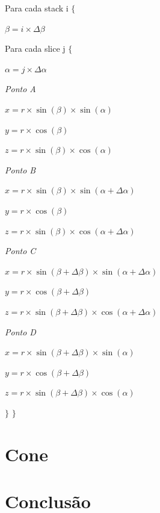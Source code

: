 \documentclass{article}
\begin{document}
Para cada stack i $\{$\newline
\par $\beta = i \times \Delta\beta$ \newline
\par Para cada slice j $\{$ \newline
\par $\alpha = j \times \Delta\alpha$ \newline\newline
\par\textit{Ponto A} \newline
\par$x = r\times\sin(\beta)\times\sin(\alpha)$ \newline
\par$y = r\times\cos(\beta)$ \newline
\par$z = r\times\sin(\beta)\times\cos(\alpha)$ \newline\newline
\par\textit{Ponto B} \newline
\par$x = r\times\sin(\beta)\times\sin(\alpha + \Delta\alpha)$ \newline
\par$y = r\times\cos(\beta)$ \newline
\par$z = r\times\sin(\beta)\times\cos(\alpha + \Delta\alpha)$ \newline\newline
\par\textit{Ponto C} \newline
\par$x = r\times\sin(\beta + \Delta\beta)\times\sin(\alpha + \Delta\alpha)$ \newline
\par$y = r\times\cos(\beta + \Delta\beta)$ \newline
\par$z = r\times\sin(\beta + \Delta\beta)\times\cos(\alpha + \Delta\alpha)$ \newline\newline
\par\textit{Ponto D} \newline
\par$x = r\times\sin(\beta + \Delta\beta)\times\sin(\alpha)$ \newline
\par$y = r\times\cos(\beta + \Delta\beta)$ \newline
\par$z = r\times\sin(\beta + \Delta\beta)\times\cos(\alpha)$ \newline
\par $\}$ \newline
$\}$ 
\newpage
\section{Cone}
\newpage
\section{Conclusão}
\end{document}
